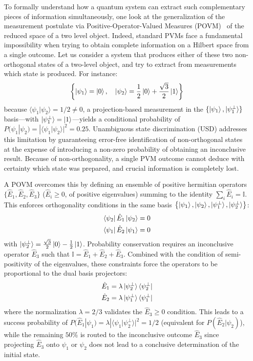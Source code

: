To formally understand how a quantum system can extract such complementary pieces of information simultaneously, one look at the generalization of the measurement postulate via Positive-Operator-Valued Measures (POVM)~\cite{Massar2007, Bergou2007} of the reduced space of a two level object. Indeed, standard PVMs face a fundamental impossibility when trying to obtain complete information on a Hilbert space from a single outcome. Let us consider a system that produces either of these two non-orthogonal states of a two-level object, and try to extract from measurements which state is produced. For instance:
\[
\left\{ \ket{\psi_1} = \ket{0}, \quad \ket{\psi_2} = \frac{1}{2}\ket{0} + \frac{\sqrt{3}}{2}\ket{1} \right\}
\]
because $\langle\psi_1\vert\psi_2\rangle = 1/2 \neq 0$, a projection-based measurement in the $\{\ket{\psi_1}, \ket{\psi_1^\perp}\}$ basis---with $\ket{\psi_1^\perp} = \ket{1}$---yields a conditional probability of $P(\psi_1|\psi_2) = |\langle\psi_1\vert\psi_2\rangle|^2 = 0.25$. Unambiguous state discrimination (USD) addresses this limitation by guaranteeing error-free identification of non-orthogonal states at the expense of introducing a non-zero probability of obtaining an inconclusive result. Because of non-orthogonality, a single PVM outcome cannot deduce with certainty which state was prepared, and crucial information is completely lost.

A POVM overcomes this by defining an ensemble of positive hermitian operators $\{\hat{E}_1, \hat{E}_2, \hat{E}_3\}$ ($\hat{E}_i \ge 0$, of positive eigenvalues) summing to the identity $\sum_i \hat{E}_i = \mathbb{I}$. This enforces orthogonality conditions in the same basis $\left\{ \ket{\psi_1}, \ket{\psi_2}, \ket{\psi_1^\perp}, \ket{\psi_2^\perp} \right\}$:
\begin{gather}
  \bra{\psi_2} \hat{E}_1 \ket{\psi_2} = 0 \label{USD condition 1}\\
  \bra{\psi_1} \hat{E}_2 \ket{\psi_1} = 0 \label{USD condition 2}
\end{gather}
with $\ket{\psi_2^{\perp}} = \frac{\sqrt{3}}{2}\ket{0} - \frac{1}{2}\ket{1}$. Probability conservation requires an inconclusive operator $\hat{E}_3$ such that $\mathbb{I} = \hat{E}_1 + \hat{E}_2 + \hat{E}_3$. Combined with the condition of semi-positivity of the eigenvalues, these constraints force the operators to be proportional to the dual basis projectors:
\begin{gather}
  \hat{E}_1 = \lambda \ket{\psi_2^\perp}\bra{\psi_2^\perp} \\
  \hat{E}_2 = \lambda \ket{\psi_1^\perp}\bra{\psi_1^\perp}
\end{gather}
where the normalization $\lambda = 2/3$ validates the $\hat{E}_3 \ge 0$ condition. This leads to a success probability of $P(\hat{E}_1|\psi_1) = \lambda |\langle\psi_1\vert\psi_2^\perp\rangle|^2 = 1/2$ (equivalent for $P(\hat{E}_2|\psi_2)$), while the remaining $50\%$ is routed to the inconclusive outcome $\hat{E}_3$ since projecting $\hat{E}_3$ onto $\psi_1$ or $\psi_2$ does not lead to a conclusive determination of the initial state.

